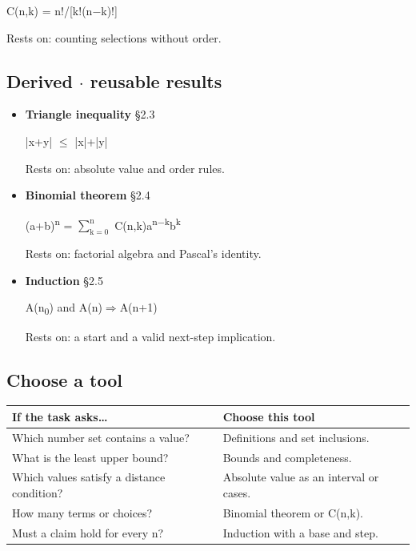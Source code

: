 \documentclass[11pt]{article}
\begin{document}
\begin{keepsection}
\begin{itemize}
C(n,k) = n!/[k!(n\ensuremath{-}k)!]

Rests on: counting selections without order.
\end{itemize}

\subsection{Derived \ensuremath{\cdot} reusable results}

\begin{itemize}
\item {}
\textbf{Triangle inequality} \hfill{\small\color{FAUblue}§2.3}

|x+y| \ensuremath{\leq} |x|+|y|

Rests on: absolute value and order rules.
\item {}
\textbf{Binomial theorem} \hfill{\small\color{FAUblue}§2.4}

(a+b)\textsuperscript{n} = $\sum_{\mathrm{k}=0}^{\mathrm{n}} $ C(n,k)a\textsuperscript{n\ensuremath{-}k}b\textsuperscript{k}

Rests on: factorial algebra and Pascal’s identity.
\item {}
\textbf{Induction} \hfill{\small\color{FAUblue}§2.5}

A(n\textsubscript{0}) and A(n)\ensuremath{\Rightarrow}A(n+1)

Rests on: a start and a valid next-step implication.
\end{itemize}

\begin{keepsection}
\subsection{Choose a tool}

\begin{center}\small\begin{tabularx}{\linewidth}{>{\raggedright\arraybackslash}X>{\raggedright\arraybackslash}X}\toprule
\textbf{If the task asks…} & \textbf{Choose this tool} \\ \midrule
Which number set contains a value? & Definitions and set inclusions. \\
What is the least upper bound? & Bounds and completeness. \\
Which values satisfy a distance condition? & Absolute value as an interval or cases. \\
How many terms or choices? & Binomial theorem or C(n,k). \\
Must a claim hold for every n? & Induction with a base and step. \\
\bottomrule\end{tabularx}\end{center}
\end{keepsection}
\end{keepsection}
\end{document}
